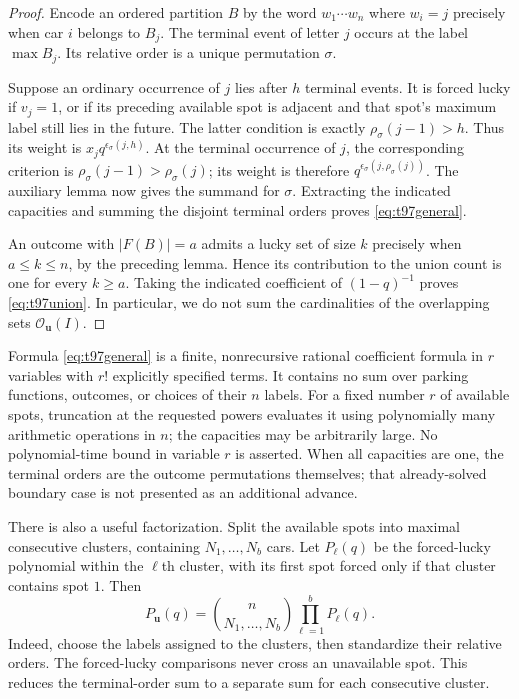\documentclass[11pt,a4paper]{article}
\theoremstyle{definition}
\theoremstyle{remark}
\begin{document}
\begin{proof}
Encode an ordered partition $B$ by the word $w_1\cdots w_n$ where
$w_i=j$ precisely when car $i$ belongs to $B_j$. The terminal event of
letter $j$ occurs at the label $\max B_j$. Its relative order is a
unique permutation $\sigma$.

Suppose an ordinary occurrence of $j$ lies after $h$ terminal events.
It is forced lucky if $v_j=1$, or if its preceding available spot is
adjacent and that spot's maximum label still lies in the future. The
latter condition is exactly $\rho_\sigma(j-1)>h$. Thus its weight is
$x_jq^{\epsilon_\sigma(j,h)}$. At the terminal occurrence of $j$,
the corresponding criterion is
$\rho_\sigma(j-1)>\rho_\sigma(j)$; its weight is therefore
$q^{\epsilon_\sigma(j,\rho_\sigma(j))}$. The auxiliary lemma now
gives the summand for $\sigma$. Extracting the indicated capacities
and summing the disjoint terminal orders proves
\eqref{eq:t97general}.

An outcome with $|F(B)|=a$ admits a lucky set of size $k$ precisely when
$a\le k\le n$, by the preceding lemma. Hence its contribution to the
union count is one for every $k\ge a$. Taking the indicated coefficient
of $(1-q)^{-1}$ proves \eqref{eq:t97union}. In particular, we do not
sum the cardinalities of the overlapping sets
$\mathcal O_{\boldsymbol u}(I)$.
\end{proof}

Formula \eqref{eq:t97general} is a finite, nonrecursive rational
coefficient formula in $r$ variables with $r!$ explicitly specified
terms. It contains no sum over parking functions, outcomes, or choices
of their $n$ labels. For a fixed number $r$ of available spots,
truncation at the requested powers evaluates it using polynomially
many arithmetic operations in $n$; the capacities may be arbitrarily
large. No polynomial-time bound in variable $r$ is asserted. When all capacities
are one, the terminal orders are the outcome permutations themselves;
that already-solved boundary case is not presented as an additional advance.

There is also a useful factorization. Split the available spots into
maximal consecutive clusters, containing $N_1,\ldots,N_b$ cars. Let
$P_\ell(q)$ be the forced-lucky polynomial within the $\ell$th cluster,
with its first spot forced only if that cluster contains spot $1$.
Then
\[
 P_{\boldsymbol u}(q)=\binom{n}{N_1,\ldots,N_b}
                         \prod_{\ell=1}^b P_\ell(q).
\]
Indeed, choose the labels assigned to the clusters, then standardize
their relative orders. The forced-lucky comparisons never cross an
unavailable spot. This reduces the terminal-order sum to a separate sum
for each consecutive cluster.
\end{document}
